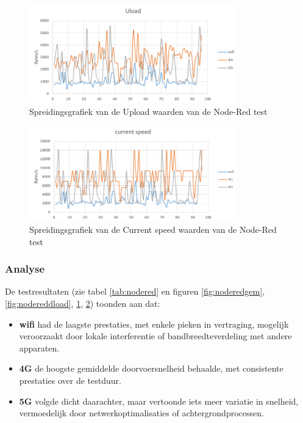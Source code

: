 \begin{figure}

    \includegraphics[width=0.8\textwidth]{../graphics/node-red_uload_grafiek.png}
    \caption[Spreidingsgrafiek van de Upload waarden van de Node-Red test]{\label{fig:nodereduload}Spreidingsgrafiek van de Upload waarden van de Node-Red test}
\end{figure}
\begin{figure}

    \includegraphics[width=0.8\textwidth]{../graphics/node-red_currentspeed_grafiek.png}
    \caption[Spreidingsgrafiek van de Current speed waarden van de Node-Red test]{\label{fig:noderedcs}Spreidingsgrafiek van de Current speed waarden van de Node-Red test}
\end{figure}
\subsubsection{Analyse}

De testresultaten (zie tabel \ref{tab:nodered} en figuren \ref{fig:noderedgem}, \ref{fig:nodereddload}, \ref{fig:nodereduload}, \ref{fig:noderedcs}) toonden aan dat:
\begin{itemize}
    \item \textbf{wifi} had de laagste prestaties, met enkele pieken in vertraging, mogelijk veroorzaakt door lokale interferentie of bandbreedteverdeling met andere apparaten.
    \item \textbf{4G} de hoogste gemiddelde doorvoersnelheid behaalde, met consistente prestaties over de testduur.
    \item \textbf{5G} volgde dicht daarachter, maar vertoonde iets meer variatie in snelheid, vermoedelijk door netwerkoptimalisaties of achtergrondprocessen.
    
\end{itemize}

